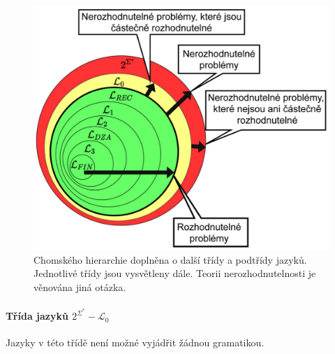 \begin{figure}[H]
    \centering
    \includegraphics[width=0.9\linewidth]{fj_hierarchy.pdf}
    \caption{Chomského hierarchie doplněna o další třídy a podtřídy jazyků. Jednotlivé třídy jsou vysvětleny dále. Teorii nerozhodnutelnosti je věnována jiná otázka.}
\end{figure}


\paragraph*{Třída jazyků $2^{\Sigma^*} - \mathcal{L}_0$} \begin{compactitem}
    \item Jazyky v této třídě není možné vyjádřit žádnou gramatikou.
\end{compactitem}


